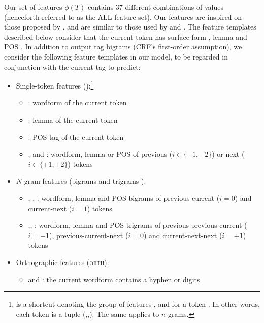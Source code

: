 \documentclass[output=paper,modfonts]{langscibook}
\begin{document}
Our set of features $\phi(T)$ contains 37 different combinations of values  (henceforth referred to as the {\textsc ALL} feature set). Our features are inspired on those proposed by \citet{constant-sigogne:2011:MWE}, and are similar to those used by \citet{Schneider14b} and \citet{riedl-biemann:2016:MWE}. The feature templates described below consider that the current token  has surface form , lemma  and POS . In addition to output tag bigrams (CRF's first-order assumption), we consider the following feature templates in our model, to be regarded in conjunction with the current tag to predict:
\begin{itemize}
\item Single-token features ():\footnote{ is a shortcut denoting the group of features ,  and  for a token . In other words, each token  is a tuple (,,). The same applies to $n$-grams.}
\begin{itemize}
\item {} : wordform of the current token
\item {} : lemma of the current token
\item {} : POS tag of the current token
\item {},  and : wordform, lemma or POS of previous ($i \in \{-1, -2\}$) or next ($i \in \{+1, +2\}$) tokens
\end{itemize}
\item $N$-gram features (bigrams  and trigrams ):
\begin{itemize}
\item {}, , : wordform, lemma and POS bigrams of previous-current ($i=0$) and current-next ($i=1$) tokens
\item {},, : wordform, lemma and POS trigrams of previous-previous-current ($i=-1$), previous-current-next ($i=0$) and current-next-next ($i=+1$) tokens
\end{itemize}
\item Orthographic features (\textsc{orth}):
\begin{itemize}
\item {} and : the current wordform  contains a hyphen or digits

\end{itemize}
\end{itemize}
\end{document}
